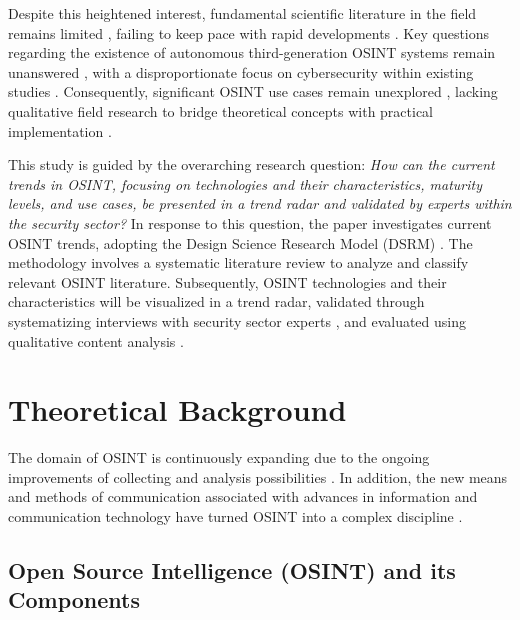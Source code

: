 \documentclass[10pt]{article}
\begin{document}
Despite this heightened interest, fundamental scientific literature in the field remains limited \cite{HerreraCubides.2020}, failing to keep pace with rapid developments \cite{Ghioni.2023, Williams.2018}. Key questions regarding the existence of autonomous third-generation OSINT systems \cite{PastorGalindo.2019, PastorGalindo.2020} remain unanswered \cite{Ghioni.2023, PastorGalindo.2020, Yogish.2021}, with a disproportionate focus on cybersecurity within existing studies \cite{Hwang.2022, PastorGalindo.2019, Yogish.2021}. Consequently, significant OSINT use cases remain unexplored \cite{AlKilani.2021, Dokman.2020, Ghioni.2023}, lacking qualitative field research to bridge theoretical concepts with practical implementation \cite{HerreraCubides.2020, PastorGalindo.2019}.

This study is guided by the overarching research question: \textit{How can the current trends in OSINT, focusing on technologies and their characteristics, maturity levels, and use cases, be presented in a trend radar and validated by experts within the security sector?} In response to this question, the paper investigates current OSINT trends, adopting the Design Science Research Model (DSRM) \cite{Peffers.2007}. The methodology involves a systematic literature review \cite{Webster.2002} to analyze and classify relevant OSINT literature. Subsequently, OSINT technologies and their characteristics will be visualized in a trend radar, validated through systematizing interviews with security sector experts \cite{Bogner.2014}, and evaluated using qualitative content analysis \cite{Billings.1997}.




\section{Theoretical Background} \label{sec:theoreticalbackground}

The domain of OSINT is continuously expanding due to the ongoing improvements of
collecting and analysis possibilities \cite{AlKilani.2021, Ghioni.2023, Williams.2018}. In
addition, the new means and methods of communication associated with advances in information
and communication technology have turned OSINT into a complex discipline
\cite{AlKilani.2021, Benes.2013, Chen.2012, Williams.2018}.

\subsection{Open Source Intelligence (OSINT) and its Components}
\end{document}
